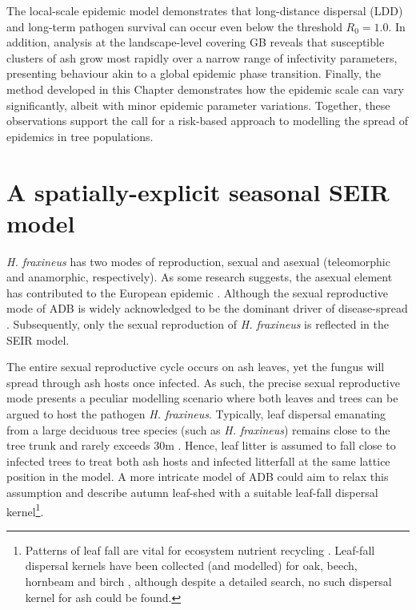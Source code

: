 The local-scale epidemic model demonstrates that long-distance dispersal (LDD) and long-term pathogen survival 
can occur even below the threshold $R_0=1.0$. In addition, analysis at the landscape-level covering GB reveals 
that susceptible clusters of ash grow most rapidly over a narrow range of infectivity parameters, 
presenting behaviour akin to a global epidemic phase transition.
Finally, the method developed in this Chapter demonstrates how the epidemic scale can vary significantly, 
albeit with minor epidemic parameter variations. Together, these observations support the call for a risk-based approach to modelling the spread of epidemics in tree populations.

\section{A spatially-explicit seasonal SEIR model}
\label{sec:seir-model}

\textit{H. fraxineus} has two modes of reproduction, sexual and asexual (teleomorphic and anamorphic, respectively).
As some research suggests, the asexual element has contributed to the European epidemic \cite{fones2016role}. 
Although the sexual reproductive mode of ADB is widely acknowledged to be the dominant driver of disease-spread 
\cite{https://doi.org/10.1111/ppa.12844, havnavckova2017direct, gross2012reproductive, Timmermann2011elal}.
Subsequently, only the sexual reproduction of \textit{H. fraxineus} is reflected in the SEIR model.

The entire sexual reproductive cycle occurs on ash leaves, yet the fungus will spread through ash hosts once infected. 
As such, the precise sexual reproductive mode presents a peculiar modelling scenario where both leaves and trees can be argued
to host the pathogen \textit{H. fraxineus}. 
Typically, leaf dispersal emanating from a large deciduous tree species (such as \textit{H. fraxineus}) remains close
to the tree trunk and rarely exceeds $30\mathrm{m}$ \cite{nickmans2019modelling}. Hence, leaf litter is assumed to fall close
to infected trees to treat both ash hosts and infected litterfall at the same lattice position in the model. 
A more intricate model of ADB could aim to relax this assumption and describe autumn leaf-shed with a suitable leaf-fall dispersal kernel\footnote{
    Patterns of leaf fall are vital for ecosystem nutrient recycling \cite{staelens2003model}. 
    Leaf-fall dispersal kernels have been collected (and modelled) for oak, beech, hornbeam and birch \cite{nickmans2019modelling},
    although despite a detailed search, no such dispersal kernel for ash could be found.
}.

